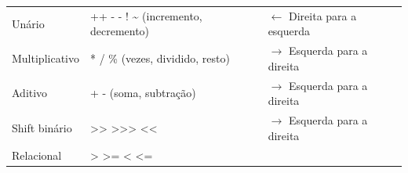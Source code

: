 \documentclass[12pt,a4paper]{article}
\begin{document}
\begin{longtable}[]{@{}lll@{}}
\begin{minipage}[t]{0.26\columnwidth}
Unário\strut
\end{minipage} & \begin{minipage}[t]{0.44\columnwidth}\raggedright
++ - - ! \textasciitilde{} (incremento, decremento)\strut
\end{minipage} & \begin{minipage}[t]{0.21\columnwidth}\raggedright
\(\leftarrow\) Direita para a esquerda\strut
\end{minipage}\tabularnewline
\begin{minipage}[t]{0.26\columnwidth}\raggedright
Multiplicativo\strut
\end{minipage} & \begin{minipage}[t]{0.44\columnwidth}\raggedright
* / \% (vezes, dividido, resto)\strut
\end{minipage} & \begin{minipage}[t]{0.21\columnwidth}\raggedright
\(\rightarrow\) Esquerda para a direita\strut
\end{minipage}\tabularnewline
\begin{minipage}[t]{0.26\columnwidth}\raggedright
Aditivo\strut
\end{minipage} & \begin{minipage}[t]{0.44\columnwidth}\raggedright
+ - (soma, subtração)\strut
\end{minipage} & \begin{minipage}[t]{0.21\columnwidth}\raggedright
\(\rightarrow\) Esquerda para a direita\strut
\end{minipage}\tabularnewline
\begin{minipage}[t]{0.26\columnwidth}\raggedright
Shift binário\strut
\end{minipage} & \begin{minipage}[t]{0.44\columnwidth}\raggedright
\textgreater{}\textgreater{} \textgreater{}\textgreater{}\textgreater{}
\textless{}\textless{}\strut
\end{minipage} & \begin{minipage}[t]{0.21\columnwidth}\raggedright
\(\rightarrow\) Esquerda para a direita\strut
\end{minipage}\tabularnewline
\begin{minipage}[t]{0.26\columnwidth}\raggedright
Relacional\strut
\end{minipage} & \begin{minipage}[t]{0.44\columnwidth}\raggedright
\textgreater{} \textgreater{}= \textless{} \textless{}=\strut
\end{minipage} & \begin{minipage}[t]{0.21\columnwidth}\raggedright

\end{minipage}
\end{longtable}
\end{document}
